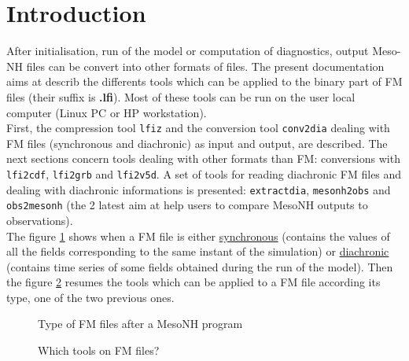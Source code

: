 \section{Introduction}

After initialisation, run of the model or computation of diagnostics, 
output Meso-NH files can be convert into other formats of files. 
The present documentation aims at describ the differents tools which can be
applied to the binary part of FM files (their suffix is {\bf .lfi}).
Most of these tools can be run on the user local
computer (Linux PC or HP workstation).
\\

First, the compression tool \texttt{lfiz} and the conversion
tool \texttt{conv2dia} dealing with FM files (synchronous and diachronic)
as input and output, are described. 
The next sections concern tools dealing with other formats than
FM: conversions with \texttt{lfi2cdf}, \texttt{lfi2grb} and \texttt{lfi2v5d}.
A set of tools for reading diachronic FM files and dealing with diachronic 
informations is presented: \texttt{extractdia}, \texttt{mesonh2obs} and 
\texttt{obs2mesonh} (the 2 latest aim at help users to compare MesoNH outputs to
observations).
\\

The figure \ref{fig:fic1} shows when a FM file is either \underline{synchronous}
(contains the values of all the fields corresponding to the same instant of the
simulation) or \underline{diachronic} (contains time series of some fields
obtained during the run of the model). 
Then the figure \ref{fig:toolstab} resumes the tools which can be applied to a
FM file according its type, one of the two previous ones. \\

\begin{figure}[htb]
\caption{Type of FM files after a MesoNH program\label{fig:fic1}}
\end{figure}

\begin{figure}[htb]
\centerline{ }
\caption{Which tools on FM files? \label{fig:toolstab}}
\end{figure}


